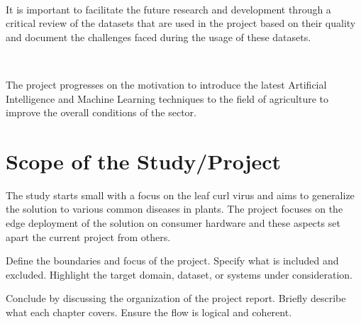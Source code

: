 \

It is important to facilitate the future research and development through a critical review of the datasets that are used in the project based on their quality and document the challenges faced during the usage of these datasets. 

\

The project progresses on the motivation to introduce the latest Artificial Intelligence and Machine Learning techniques to the field of agriculture to improve the overall conditions of the sector.

\section{Scope of the Study/Project}   
The study starts small with a focus on the leaf curl virus and aims to generalize the solution to various common diseases in plants. The project focuses on the edge deployment of the solution on consumer hardware and these aspects set apart the current project from others.

 Define the boundaries and focus of the project.
Specify what is included and excluded.
Highlight the target domain, dataset, or systems under consideration.

Conclude by discussing the organization of the project report. Briefly describe what each chapter covers.
Ensure the flow is logical and coherent.

